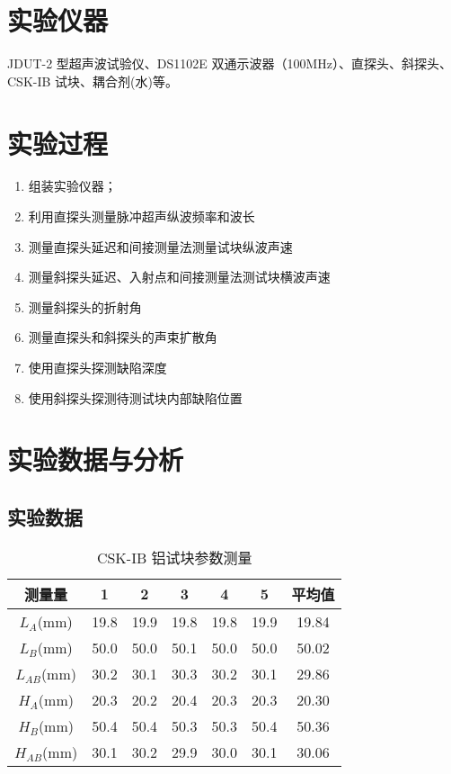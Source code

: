 \documentclass[a4paper,utf8]{article}
\begin{document}
\section{实验仪器}%
    JDUT-2 型超声波试验仪、DS1102E 双通示波器（100MHz）、直探头、斜探头、CSK-IB 试块、耦合剂(水)等。
\section{实验过程}%
    \begin{enumerate}
        \item 组装实验仪器；
        \item 利用直探头测量脉冲超声纵波频率和波长
        \item 测量直探头延迟和间接测量法测量试块纵波声速
        \item 测量斜探头延迟、入射点和间接测量法测试块横波声速
        \item 测量斜探头的折射角
        \item 测量直探头和斜探头的声束扩散角
        \item 使用直探头探测缺陷深度
        \item 使用斜探头探测待测试块内部缺陷位置
    \end{enumerate}
\section{实验数据与分析}
\subsection{实验数据\label{sss:data}}
\begin{table}[!ht]
    \caption{CSK-IB 铝试块参数测量}\label{tab:length}
    \begin{tabularx}{\textwidth}{*{7}{C}} \toprule
        测量量 & 1 & 2 & 3 & 4 & 5 & 平均值 \\ \midrule
        $L_A$(\unit{\mm}) & 19.8 & 19.9 & 19.8 & 19.8 & 19.9 & 19.84 \\ 
        $L_B$(\unit{\mm}) & 50.0 & 50.0 & 50.1 & 50.0 & 50.0 & 50.02 \\ 
        $L_{AB}$(\unit{\mm}) & 30.2 & 30.1 & 30.3 & 30.2 & 30.1 & 29.86 \\[2mm]
        $H_A$(\unit{\mm}) & 20.3 & 20.2 & 20.4 & 20.3 & 20.3 & 20.30 \\
        $H_B$(\unit{\mm}) & 50.4 & 50.4 & 50.3 & 50.3 & 50.4 & 50.36 \\
        $H_{AB}$(\unit{\mm}) & 30.1 & 30.2 & 29.9 & 30.0 & 30.1 & 30.06 \\ \bottomrule
    \end{tabularx}
\end{table}
\end{document}

